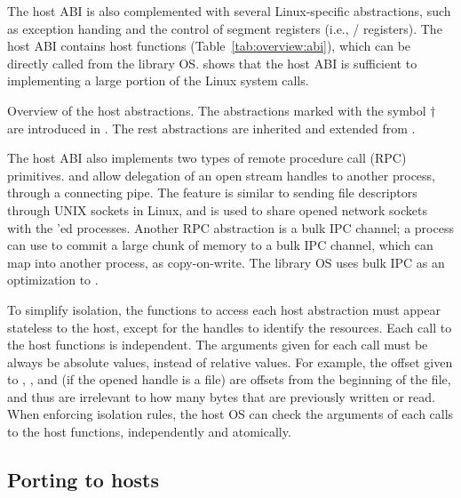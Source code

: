 The host ABI is also complemented with several Linux-specific abstractions, such as exception handing and the control of segment registers (i.e., / registers).
The host ABI contains \palcalls{} host functions (Table~\ref{tab:overview:abi}), which can be directly called from the library OS. \graphene{} shows that the host ABI is sufficient to implementing a large portion of the Linux system calls.


\begin{table}[t!]
\centering

\caption{Overview of the \graphene{} host abstractions. The abstractions marked with the symbol $\dagger$ are introduced in \graphene{}. The rest abstractions are inherited and extended from \drawbridge{}.}
\label{tab:overview:abi}
\end{table}


The host ABI also implements two types of remote procedure call (RPC) primitives.
 and 
allow delegation of an open stream handles to another process, through a connecting pipe. The feature is similar to sending file descriptors through UNIX sockets in Linux, and is used to share opened network sockets with the 'ed processes.
Another RPC abstraction is a bulk IPC channel; a process can use  to commit a large chunk of memory to a bulk IPC channel, which  can map into another process, as copy-on-write. The library OS uses bulk IPC as an optimization to .


To simplify isolation, the functions to access each host abstraction must appear  stateless to the host, except for the handles to identify the resources. Each call to the host functions is independent. The arguments given for each call must be always be absolute values, instead of relative values.
For example, the offset given to , , and  (if the opened handle is a file) are offsets from the beginning of the file, and thus are irrelevant to how many bytes that are previously written or read.
When enforcing isolation rules, the host OS can check the arguments of each calls to the host functions, independently and atomically.

\subsection{Porting to hosts}
\label{sec:overview:host:port}


